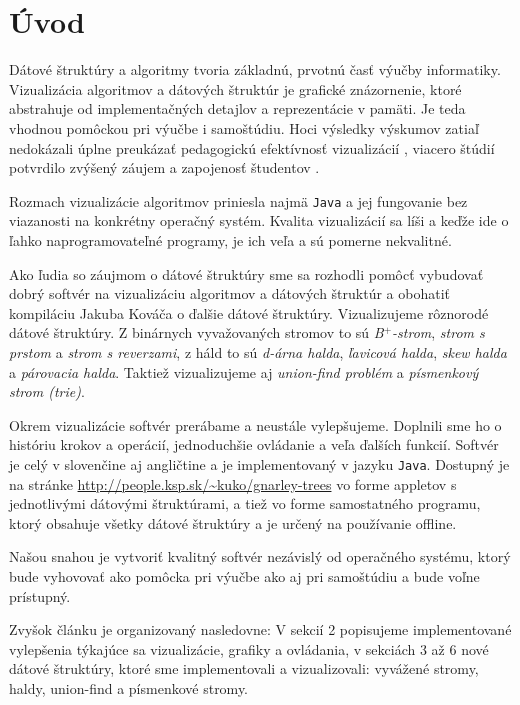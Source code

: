 \section{Úvod}
Dátové štruktúry a algoritmy tvoria základnú, prvotnú časť výučby 
informatiky. Vizualizácia algoritmov a dátových štruktúr je grafické 
znázornenie, ktoré abstrahuje od implementačných detajlov a reprezentácie
v pamäti. Je teda vhodnou pomôckou pri výučbe i samoštúdiu. Hoci výsledky
výskumov zatiaľ nedokázali úplne preukázať pedagogickú efektívnosť
vizualizácií \citep{shaffer}, viacero štúdií potvrdilo zvýšený záujem
a zapojenosť študentov \citep{naps02, hundhausen02}.


Rozmach vizualizácie algoritmov priniesla najmä {\tt Java} a jej fungovanie 
bez viazanosti na konkrétny operačný systém. Kvalita vizualizácií sa líši 
a keďže ide o ľahko naprogramovateľné programy, je ich veľa a sú pomerne 
nekvalitné. 

Ako ľudia so záujmom o dátové štruktúry sme sa rozhodli pomôcť vybudovať 
dobrý softvér na vizualizáciu algoritmov a dátových štruktúr a obohatiť 
kompiláciu Jakuba Kováča \citep{kuko} o ďalšie dátové štruktúry. 
Vizualizujeme rôznorodé dátové štruktúry. Z binárnych vyvažovaných stromov 
to sú \emph{B$^+$-strom}, \emph{strom s prstom} a \emph{strom s reverzami}, z háld to sú \emph{d-árna 
halda}, \emph{ľavicová halda}, \emph{skew halda} a \emph{párovacia halda}. 
Taktiež vizualizujeme aj \emph{union-find problém} a 
\emph{písmenkový strom (trie)}. 

Okrem vizualizácie softvér prerábame a neustále vylepšujeme.
Doplnili sme ho o históriu krokov a operácií, jednoduchšie ovládanie
a veľa ďalších funkcií. Softvér je celý v slovenčine aj angličtine a je 
implementovaný v jazyku \texttt{Java}. Dostupný je na stránke
\hbox{\url{http://people.ksp.sk/~kuko/gnarley-trees}} vo forme appletov
s jednotlivými dátovými štruktúrami, a tiež vo forme samostatného programu,
ktorý obsahuje všetky dátové štruktúry a je určený na používanie offline.

Našou snahou je vytvoriť kvalitný softvér nezávislý od operačného systému, 
ktorý bude vyhovovať ako pomôcka pri výučbe ako aj pri samoštúdiu a bude
voľne prístupný. 

Zvyšok článku je organizovaný nasledovne: V sekcií 2 popisujeme implementované
vylepšenia týkajúce sa vizualizácie, grafiky a ovládania, v sekciách 3 až 6
nové dátové štruktúry, ktoré sme implementovali a vizualizovali: vyvážené
stromy, haldy, union-find a písmenkové stromy.